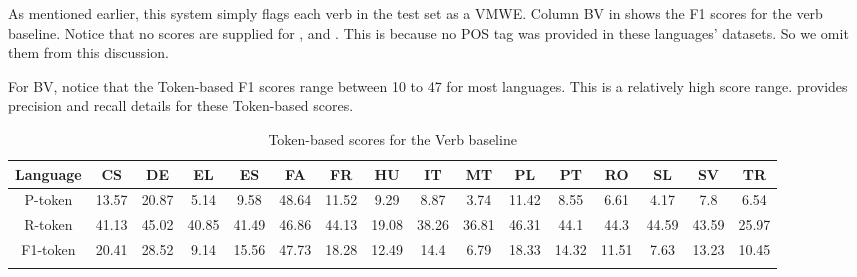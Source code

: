 \documentclass[output=paper
,modfonts
,nonflat,draftmode]{langsci/langscibook}
\begin{document}
As mentioned earlier, this system simply flags each verb in the test set as a VMWE. Column BV in  shows the F1 scores for the verb baseline. Notice that no scores are supplied for ,  and . This is because no POS tag was provided in these languages' datasets. So we omit them from this discussion.


For BV, notice that the Token-based F1 scores range between 10 to 47 for most languages. This is a relatively high score range.  provides precision and recall details for these Token-based scores. 

\begin{table}
\caption{\label{tbl:random-token-scores}Token-based scores for the Verb baseline}

{\scriptsize{}}%
\setlength\tabcolsep{2.0pt} %
\renewcommand{\arraystretch}{0.65} %
\begin{tabular}{cccccccccccccccc}
\lsptoprule
{\scriptsize{}Language} & {\scriptsize{}CS} & {\scriptsize{}DE} & {\scriptsize{}EL} & {\scriptsize{}ES} & {\scriptsize{}FA} & {\scriptsize{}FR} & {\scriptsize{}HU} & {\scriptsize{}IT} & {\scriptsize{}MT} & {\scriptsize{}PL} & {\scriptsize{}PT} & {\scriptsize{}RO} & {\scriptsize{}SL} & {\scriptsize{}SV} & {\scriptsize{}TR}\tabularnewline
\midrule
{\scriptsize{}P-token} & {\scriptsize{}13.57} & {\scriptsize{}20.87} & {\scriptsize{}5.14} & {\scriptsize{}9.58} & {\scriptsize{}48.64} & {\scriptsize{}11.52} & {\scriptsize{}9.29} & {\scriptsize{}8.87} & {\scriptsize{}3.74} & {\scriptsize{}11.42} & {\scriptsize{}8.55} & {\scriptsize{}6.61} & {\scriptsize{}4.17} & {\scriptsize{}7.8} & {\scriptsize{}6.54}\tabularnewline
{\scriptsize{}R-token} & {\scriptsize{}41.13} & {\scriptsize{}45.02} & {\scriptsize{}40.85} & {\scriptsize{}41.49} & {\scriptsize{}46.86} & {\scriptsize{}44.13} & {\scriptsize{}19.08} & {\scriptsize{}38.26} & {\scriptsize{}36.81} & {\scriptsize{}46.31} & {\scriptsize{}44.1} & {\scriptsize{}44.3} & {\scriptsize{}44.59} & {\scriptsize{}43.59} & {\scriptsize{}25.97}\tabularnewline
{\scriptsize{}F1-token} & {\scriptsize{}20.41} & {\scriptsize{}28.52} & {\scriptsize{}9.14} & {\scriptsize{}15.56} & {\scriptsize{}47.73} & {\scriptsize{}18.28} & {\scriptsize{}12.49} & {\scriptsize{}14.4} & {\scriptsize{}6.79} & {\scriptsize{}18.33} & {\scriptsize{}14.32} & {\scriptsize{}11.51} & {\scriptsize{}7.63} & {\scriptsize{}13.23} & {\scriptsize{}10.45}\tabularnewline
\lspbottomrule
\end{tabular}

\end{table}
\end{document}
